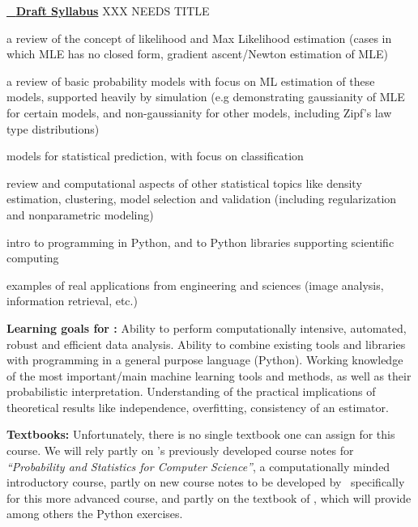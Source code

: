 \vskip 0.2in
\bit
\item  \underline{\statcl~ {\bf Draft Syllabus}}  XXX NEEDS TITLE \\
\bit
\item a review of the concept of likelihood and Max Likelihood estimation (cases in which MLE has no closed form, gradient ascent/Newton estimation of MLE)
\item a review of basic probability models with focus on ML estimation of these models, supported heavily by simulation (e.g demonstrating gaussianity of MLE for certain models, and non-gaussianity for other models, including Zipf's law type distributions)
\item models for statistical prediction, with focus on classification
\item review and computational aspects of other statistical topics like
  density estimation, clustering, model selection and validation
  (including regularization and  nonparametric modeling)
\item intro to programming in Python, and to Python libraries supporting scientific computing
\item examples of real applications from engineering and sciences (image analysis, information retrieval, etc.)
\eit
\item[]{\bf Learning goals for \statcl:} Ability to perform computationally intensive, automated, robust and efficient data analysis. Ability to combine existing tools and libraries with programming in a general purpose language (Python). 
Working knowledge of the most important/main machine learning tools and methods, as well as their probabilistic interpretation. Understanding of the practical implications of theoretical results like independence, overfitting, consistency of an estimator. 

{\bf Textbooks:} Unfortunately, there is no single textbook one can
assign for this course. We will rely partly on \meila's previously
developed course notes for {\it ``Probability and Statistics for
  Computer Science''}, a computationally minded introductory course,
partly on new course notes to be developed by \meila\ specifically for
this more advanced course, and partly on the textbook of \astrocl,
which will provide among others the Python exercises. %

